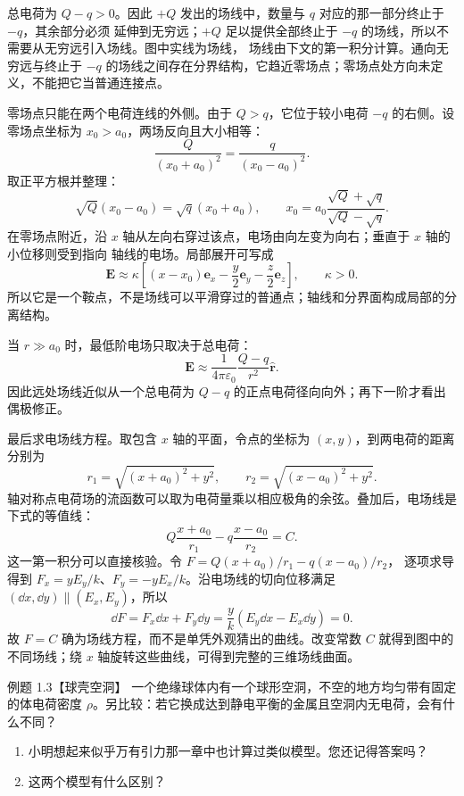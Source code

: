 \begin{xesolution}
总电荷为 $Q-q>0$。因此 $+Q$ 发出的场线中，数量与 $q$ 对应的那一部分终止于 $-q$，其余部分必须
延伸到无穷远；$+Q$ 足以提供全部终止于 $-q$ 的场线，所以不需要从无穷远引入场线。图中实线为场线，
场线由下文的第一积分计算。通向无穷远与终止于 $-q$ 的场线之间存在分界结构，它趋近零场点；零场点处方向未定义，不能把它当普通连接点。

\unequalChargesFigure

零场点只能在两个电荷连线的外侧。由于 $Q>q$，它位于较小电荷 $-q$ 的右侧。设零场点坐标为
$x_0>a_0$，两场反向且大小相等：
\[
  \frac{Q}{(x_0+a_0)^2}=\frac{q}{(x_0-a_0)^2}.
\]
取正平方根并整理：
\[
  \sqrt Q(x_0-a_0)=\sqrt q(x_0+a_0),
  \qquad
  \boxed{x_0=a_0\frac{\sqrt Q+\sqrt q}{\sqrt Q-\sqrt q}}.
\]
在零场点附近，沿 $x$ 轴从左向右穿过该点，电场由向左变为向右；垂直于 $x$ 轴的小位移则受到指向
轴线的电场。局部展开可写成
\[
  \boldsymbol E\approx\kappa\left[(x-x_0)\boldsymbol e_x
  -\frac{y}{2}\boldsymbol e_y-\frac{z}{2}\boldsymbol e_z\right],\qquad\kappa>0.
\]
所以它是一个鞍点，不是场线可以平滑穿过的普通点；轴线和分界面构成局部的分离结构。

当 $r\gg a_0$ 时，最低阶电场只取决于总电荷：
\[
  \boxed{\boldsymbol E\approx\frac{1}{4\pi\varepsilon_0}
  \frac{Q-q}{r^2}\hat{\boldsymbol r}}.
\]
因此远处场线近似从一个总电荷为 $Q-q$ 的正点电荷径向向外；再下一阶才看出偶极修正。

最后求电场线方程。取包含 $x$ 轴的平面，令点的坐标为 $(x,y)$，到两电荷的距离分别为
\[
  r_1=\sqrt{(x+a_0)^2+y^2},\qquad r_2=\sqrt{(x-a_0)^2+y^2}.
\]
轴对称点电荷场的流函数可以取为电荷量乘以相应极角的余弦。叠加后，电场线是下式的等值线：
\[
  \boxed{Q\frac{x+a_0}{r_1}-q\frac{x-a_0}{r_2}=C}.
\]
这一第一积分可以直接核验。令 $F=Q(x+a_0)/r_1-q(x-a_0)/r_2$，
逐项求导得到 $F_x=yE_y/k$、$F_y=-yE_x/k$。沿电场线的切向位移满足
$(\dd x,\dd y)\parallel(E_x,E_y)$，所以
\[
 \dd F=F_x\dd x+F_y\dd y=\frac yk(E_y\dd x-E_x\dd y)=0.
\]
故 $F=C$ 确为场线方程，而不是单凭外观猜出的曲线。改变常数 $C$ 就得到图中的不同场线；绕 $x$ 轴旋转这些曲线，可得到完整的三维场线曲面。
\end{xesolution}

\begin{origexamplebox}{例题 1.3【球壳空洞】}
一个绝缘球体内有一个球形空洞，不空的地方均匀带有固定的体电荷密度 $\rho$。另比较：若它换成达到静电平衡的金属且空洞内无电荷，会有什么不同？
\begin{enumerate}[label=\arabic*.]
  \item 小明想起来似乎万有引力那一章中也计算过类似模型。您还记得答案吗？
  \item 这两个模型有什么区别？
\end{enumerate}
\end{origexamplebox}


